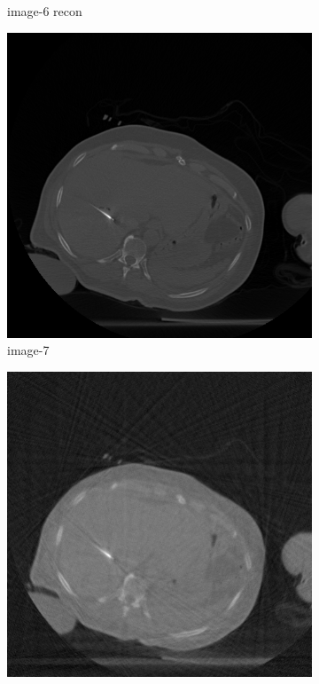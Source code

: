 \documentclass[journal]{IEEEtran}
\begin{document}
\begin{figure}[!h]
\begin{subfigure}[b]{0.24\linewidth}
\captionsetup{labelformat=empty}       
 \caption{image-6 recon}
    \end{subfigure}
 \begin{subfigure}[b]{0.24\linewidth}
        \includegraphics[width=\textwidth]{../images/tmh/RFA2/template7.png}
\captionsetup{labelformat=empty}       
 \caption{image-7}
    \end{subfigure}
       \begin{subfigure}[b]{0.24\linewidth}
        \includegraphics[width=\textwidth]{../images/tmh/RFA2/new_protocol/result_image_7.png}

\end{subfigure}
\end{figure}
\end{document}
